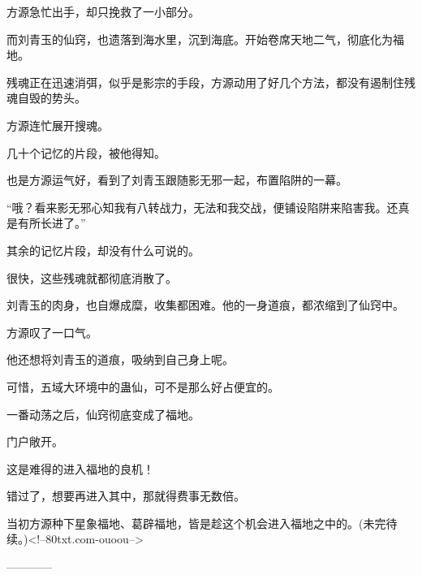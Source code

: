 \begin{this_body}
方源急忙出手，却只挽救了一小部分。

而刘青玉的仙窍，也遗落到海水里，沉到海底。开始卷席天地二气，彻底化为福地。

残魂正在迅速消弭，似乎是影宗的手段，方源动用了好几个方法，都没有遏制住残魂自毁的势头。

方源连忙展开搜魂。

几十个记忆的片段，被他得知。

也是方源运气好，看到了刘青玉跟随影无邪一起，布置陷阱的一幕。

“哦？看来影无邪心知我有八转战力，无法和我交战，便铺设陷阱来陷害我。还真是有所长进了。”

其余的记忆片段，却没有什么可说的。

很快，这些残魂就都彻底消散了。

刘青玉的肉身，也自爆成糜，收集都困难。他的一身道痕，都浓缩到了仙窍中。

方源叹了一口气。

他还想将刘青玉的道痕，吸纳到自己身上呢。

可惜，五域大环境中的蛊仙，可不是那么好占便宜的。

一番动荡之后，仙窍彻底变成了福地。

门户敞开。

这是难得的进入福地的良机！

错过了，想要再进入其中，那就得费事无数倍。

当初方源种下星象福地、葛辟福地，皆是趁这个机会进入福地之中的。(未完待续。)<!--80txt.com-ouoou-->

------------

\end{this_body}

